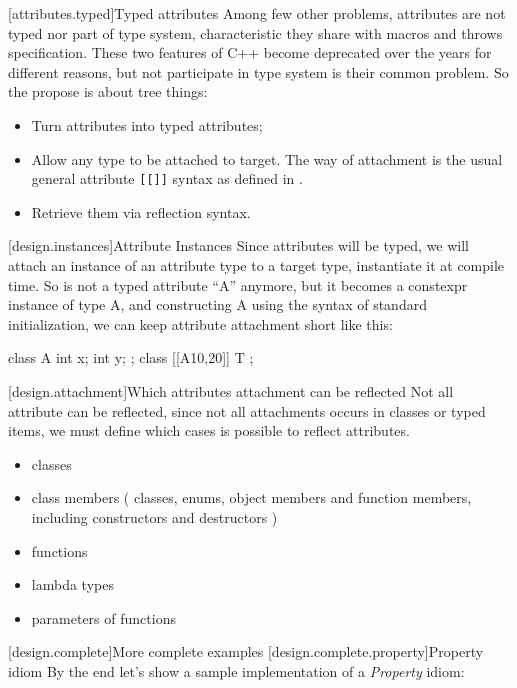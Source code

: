 [attributes.typed]{Typed attributes}
Among few other problems, attributes are not typed nor part of type system, characteristic they share with macros and throws specification. These two features of C++ become deprecated over the years for different reasons, but not participate in type system is their common problem. So the propose is about tree things:
\begin{itemize}
\item Turn attributes into typed attributes; 
\item Allow any type to be attached to target. The way of attachment is the usual general attribute \texttt{[[]]}
 syntax as defined in .
\item Retrieve them via reflection  syntax.
\end{itemize}
[design.instances]{Attribute Instances}
Since attributes will be typed, we will attach an instance of an attribute type to a target type, instantiate it at compile time. So \tcode{[[A]]} is not a typed attribute ``A'' anymore, but it becomes a constexpr instance of type A, and constructing A using the syntax of standard initialization, we can keep attribute attachment short like this:\\
\enterexample
\begin{codeblock}
class A {
 int x; 
 int y;
};
class [[A{10,20}]] T {
};
\end{codeblock}
\exitexample
{}[design.attachment]{Which attributes attachment can be reflected}
Not all attribute can be reflected, since not all attachments occurs in classes or typed items, we must define which cases is possible to reflect attributes.
\begin{itemize}
\item classes
\item class members ( classes, enums, object members and function members, including constructors and destructors )
\item functions
\item lambda types
\item parameters of functions
\end{itemize}
[design.complete]{More complete examples}
[design.complete.property]{Property idiom}
By the end let's show a sample implementation of a \emph{Property} idiom:
